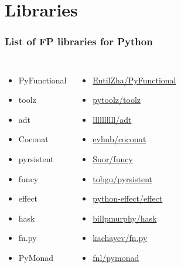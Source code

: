 \documentclass[18pt, compress, aspectratio=169]{beamer}
\begin{document}

\section{Libraries}

\fontsize{15pt}{16}\selectfont
\begin{frame}
    \frametitle{List of FP libraries for Python}
    \vspace{-35pt}
    \begin{columns}[T,onlytextwidth]
        \begin{itemize}[label={\MVRightarrow}]
            \item PyFunctional
            \item toolz
            \item adt
            \item Coconat
            \item pyrsistent
            \item funcy
            \item effect
            \item hask
            \item fn.py
            \item PyMonad
        \end{itemize}

        \begin{itemize}[label={}]
            \item \href{github.com/EntilZha/PyFunctional}{EntilZha/PyFunctional}
            \item \href{github.com/pytoolz/toolz}{pytoolz/toolz}
            \item \href{github.com/llllllllll/adt}{llllllllll/adt}
            \item \href{github.com/evhub/coconut}{evhub/coconut}
            \item \href{github.com/Suor/funcy}{Suor/funcy}
            \item \href{github.com/tobgu/pyrsistent}{tobgu/pyrsistent}
            \item \href{github.com/python-effect/effect}{python-effect/effect}
            \item \href{github.com/billpmurphy/hask}{billpmurphy/hask}
            \item \href{github.com/kachayev/fn.py}{kachayev/fn.py}
            \item \href{github.com/fnl/pymonad}{fnl/pymonad}
        \end{itemize}

    \end{columns}
\end{frame}
\fontsize{19pt}{20}\selectfont
\end{document}
